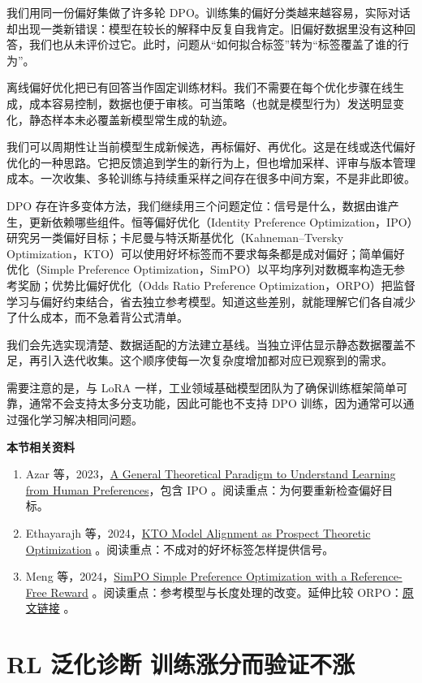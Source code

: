 我们用同一份偏好集做了许多轮 DPO。训练集的偏好分类越来越容易，实际对话却出现一类新错误：模型在较长的解释中反复自我肯定。旧偏好数据里没有这种回答，我们也从未评价过它。此时，问题从``如何拟合标签''转为``标签覆盖了谁的行为''。

离线偏好优化把已有回答当作固定训练材料。我们不需要在每个优化步骤在线生成，成本容易控制，数据也便于审核。可当策略（也就是模型行为）发送明显变化，静态样本未必覆盖新模型常生成的轨迹。

我们可以周期性让当前模型生成新候选，再标偏好、再优化。这是在线或迭代偏好优化的一种思路。它把反馈追到学生的新行为上，但也增加采样、评审与版本管理成本。一次收集、多轮训练与持续重采样之间存在很多中间方案，不是非此即彼。

DPO 存在许多变体方法，我们继续用三个问题定位：信号是什么，数据由谁产生，更新依赖哪些组件。恒等偏好优化（Identity Preference Optimization，IPO）研究另一类偏好目标；卡尼曼与特沃斯基优化（Kahneman--Tversky Optimization，KTO）可以使用好坏标签而不要求每条都是成对偏好；简单偏好优化（Simple Preference Optimization，SimPO）以平均序列对数概率构造无参考奖励；优势比偏好优化（Odds Ratio Preference Optimization，ORPO）把监督学习与偏好约束结合，省去独立参考模型。知道这些差别，就能理解它们各自减少了什么成本，而不急着背公式清单。

我们会先选实现清楚、数据适配的方法建立基线。当独立评估显示静态数据覆盖不足，再引入迭代收集。这个顺序使每一次复杂度增加都对应已观察到的需求。

需要注意的是，与 LoRA 一样，工业领域基础模型团队为了确保训练框架简单可靠，通常不会支持太多分支功能，因此可能也不支持 DPO 训练，因为通常可以通过强化学习解决相同问题。

\textbf{本节相关资料}
\begin{enumerate}
    \item Azar 等，2023，\href{https://arxiv.org/abs/2310.12036}{A General Theoretical Paradigm to Understand Learning from Human Preferences}，包含 IPO 。阅读重点：为何要重新检查偏好目标。
    \item Ethayarajh 等，2024，\href{https://arxiv.org/abs/2402.01306}{KTO Model Alignment as Prospect Theoretic Optimization} 。阅读重点：不成对的好坏标签怎样提供信号。
    \item Meng 等，2024，\href{https://arxiv.org/abs/2405.14734}{SimPO Simple Preference Optimization with a Reference-Free Reward} 。阅读重点：参考模型与长度处理的改变。延伸比较 ORPO：\href{https://arxiv.org/abs/2403.07691}{{原文链接}} 。
\end{enumerate}

\section{RL 泛化诊断 训练涨分而验证不涨}\label{RL 泛化诊断 训练涨分而验证不涨}

